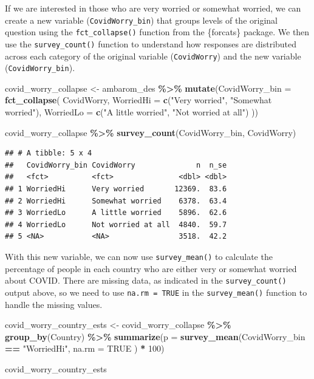 \documentclass[
]{krantz}
\makeatletter
\newenvironment{Shaded}{\begin{snugshade}}{\end{snugshade}}
\newcommand{\AttributeTok}[1]{\textcolor[rgb]{0.27,0.27,0.27}{#1}}
\newcommand{\ConstantTok}[1]{\textcolor[rgb]{0.37,0.37,0.37}{#1}}
\newcommand{\DecValTok}[1]{\textcolor[rgb]{0.06,0.06,0.06}{#1}}
\newcommand{\FunctionTok}[1]{\textcolor[rgb]{0.27,0.27,0.27}{\textbf{#1}}}
\newcommand{\NormalTok}[1]{#1}
\newcommand{\OtherTok}[1]{\textcolor[rgb]{0.37,0.37,0.37}{#1}}
\newcommand{\SpecialCharTok}[1]{\textcolor[rgb]{0.43,0.43,0.43}{\textbf{#1}}}
\newcommand{\StringTok}[1]{\textcolor[rgb]{0.5,0.5,0.5}{#1}}
\newenvironment{kframe}{%
\medskip{}
\setlength{\fboxsep}{.8em}
 \def\at@end@of@kframe{}%
 \ifinner\ifhmode%
  \def\at@end@of@kframe{\end{minipage}}%
  \begin{minipage}{\columnwidth}%
 \fi\fi%
 \def\FrameCommand##1{\hskip\@totalleftmargin \hskip-\fboxsep
 \colorbox{shadecolor}{##1}\hskip-\fboxsep
     \hskip-\linewidth \hskip-\@totalleftmargin \hskip\columnwidth}%
 \MakeFramed {\advance\hsize-\width
   \@totalleftmargin\z@ \linewidth\hsize
   \@setminipage}}%
 {\par\unskip\endMakeFramed%
 \at@end@of@kframe}
\renewenvironment{Shaded}{\begin{kframe}}{\end{kframe}}
\makeatother
\begin{document}
If we are interested in those who are very worried or somewhat worried, we can create a new variable (\texttt{CovidWorry\_bin}) that groups levels of the original question using the \texttt{fct\_collapse()} function from the \{forcats\} package. We then use the \texttt{survey\_count()} function to understand how responses are distributed across each category of the original variable (\texttt{CovidWorry}) and the new variable (\texttt{CovidWorry\_bin}).

\begin{Shaded}
\begin{Highlighting}[]
\NormalTok{covid\_worry\_collapse }\OtherTok{\textless{}{-}}\NormalTok{ ambarom\_des }\SpecialCharTok{\%\textgreater{}\%}
  \FunctionTok{mutate}\NormalTok{(}\AttributeTok{CovidWorry\_bin =} \FunctionTok{fct\_collapse}\NormalTok{(}
\NormalTok{    CovidWorry,}
    \AttributeTok{WorriedHi =} \FunctionTok{c}\NormalTok{(}\StringTok{"Very worried"}\NormalTok{, }\StringTok{"Somewhat worried"}\NormalTok{),}
    \AttributeTok{WorriedLo =} \FunctionTok{c}\NormalTok{(}\StringTok{"A little worried"}\NormalTok{, }\StringTok{"Not worried at all"}\NormalTok{)}
\NormalTok{  ))}

\NormalTok{covid\_worry\_collapse }\SpecialCharTok{\%\textgreater{}\%}
  \FunctionTok{survey\_count}\NormalTok{(CovidWorry\_bin, CovidWorry)}
\end{Highlighting}
\end{Shaded}

\begin{verbatim}
## # A tibble: 5 x 4
##   CovidWorry_bin CovidWorry              n  n_se
##   <fct>          <fct>               <dbl> <dbl>
## 1 WorriedHi      Very worried       12369.  83.6
## 2 WorriedHi      Somewhat worried    6378.  63.4
## 3 WorriedLo      A little worried    5896.  62.6
## 4 WorriedLo      Not worried at all  4840.  59.7
## 5 <NA>           <NA>                3518.  42.2
\end{verbatim}

With this new variable, we can now use \texttt{survey\_mean()} to calculate the percentage of people in each country who are either very or somewhat worried about COVID. There are missing data, as indicated in the \texttt{survey\_count()} output above, so we need to use \texttt{na.rm\ =\ TRUE} in the \texttt{survey\_mean()} function to handle the missing values.

\begin{Shaded}
\begin{Highlighting}[]
\NormalTok{covid\_worry\_country\_ests }\OtherTok{\textless{}{-}}\NormalTok{ covid\_worry\_collapse }\SpecialCharTok{\%\textgreater{}\%}
  \FunctionTok{group\_by}\NormalTok{(Country) }\SpecialCharTok{\%\textgreater{}\%}
  \FunctionTok{summarize}\NormalTok{(}\AttributeTok{p =} \FunctionTok{survey\_mean}\NormalTok{(CovidWorry\_bin }\SpecialCharTok{==} \StringTok{"WorriedHi"}\NormalTok{,}
    \AttributeTok{na.rm =} \ConstantTok{TRUE}
\NormalTok{  ) }\SpecialCharTok{*} \DecValTok{100}\NormalTok{)}

\NormalTok{covid\_worry\_country\_ests}
\end{Highlighting}
\end{Shaded}
\end{document}
